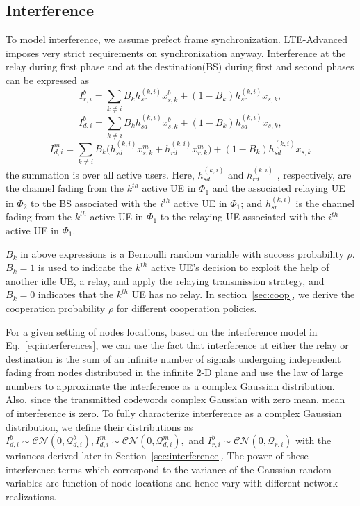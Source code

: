 \documentclass[titlepage]{article}
\begin{document}
\subsection{Interference}
To model interference, we assume prefect frame synchronization. LTE-Advanced imposes very strict requirements on synchronization anyway. Interference at the relay during first phase and at the destination(BS) during first and second phases can be expressed as
\begin{equation*}
I_{r,i}^b = \sum_{k \neq i} B_k h^{(k,i)}_{sr} x_{s,k}^b + (1-B_k)h_{sr}^{(k,i)}x_{s,k} ,
\end{equation*}
\begin{equation*}
I_{d,i}^b = \sum_{k \neq i} B_k h_{sd}^{(k,i)} x^b_{s,k} + (1-B_k)h_{sd}^{(k,i)}x_{s,k},
\end{equation*}
\begin{equation} \label{eq:interferences}
I_{d,i}^m = \sum_{k \neq i} B_k \Big(h_{sd}^{(k,i)} x^m_{s,k} + h_{rd}^{(k,i)} x^m_{r,k}\Big) + (1-B_k)h_{sd}^{(k,i)}x_{s,k}
\end{equation}
the summation is over all active users. Here, $h_{sd}^{(k,i)}$ and $h_{rd}^{(k,i)}$ , respectively, are the channel fading from the $k^{th}$ active UE in $\Phi_1$ and the associated relaying UE in $\Phi_2$ to the BS associated with the $i^{th}$ active UE in $\Phi_1$; and $h_{sr}^{(k,i)}$ is the channel fading from the $k^{th}$ active UE in $\Phi_1$ to the relaying UE associated with the $i^{th}$ active UE in $\Phi_1$.
\par $B_k$ in above expressions is a Bernoulli random variable with success probability $\rho$. $B_k = 1$ is used to indicate the $k^{th}$ active UE's decision to exploit the help of another idle UE, a relay, and apply the relaying transmission strategy, and $B_k = 0$ indicates that the $k^{th}$ UE has no relay. In section~\ref{sec:coop}, we derive the cooperation probability $\rho$ for different cooperation policies.
\par
 For a given setting of nodes locations, based on the
interference model in Eq.~\ref{eq:interferences}, we can use the fact
that interference at either the relay or destination is the
sum of an infinite number of signals undergoing independent fading from nodes distributed in the infinite 2-D plane and use the law of large numbers to approximate the interference as a complex Gaussian distribution.
Also, since the transmitted codewords complex Gaussian with zero mean, mean of interference is zero. To fully characterize interference as a
complex Gaussian distribution, we define their distributions as $ I_{d,i}^b \sim \mathcal{CN} (0,\mathcal{Q}_{d,i}^b), I_{d,i}
^m \sim \mathcal{CN}(0,\mathcal{Q}_{d,i}^m),$ and $I_{r,i}^b \sim \mathcal{CN}
(0,\mathcal{Q}_{r,i})$ with the variances derived later
in Section~\ref{sec:interference}. The power of these interference terms which
correspond to the variance of the Gaussian random variables
are function of node locations and hence vary with different
network realizations.
\end{document}
